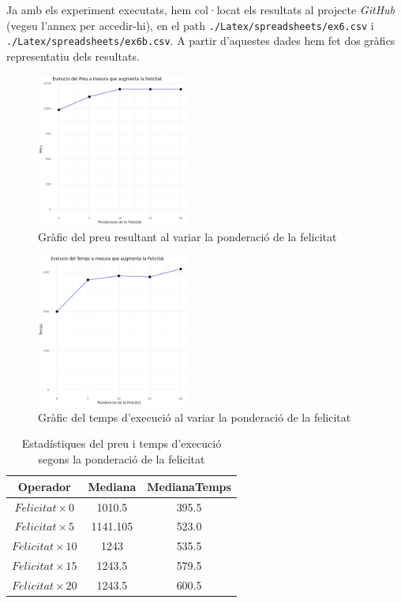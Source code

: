 \documentclass[a4paper]{article}
\begin{document}
	Ja amb els experiment executats, hem col·locat els resultats al projecte \textit{GitHub} (vegeu l'annex per accedir-hi), en el path \texttt{./Latex/spreadsheets/ex6.csv} i \texttt{./Latex/spreadsheets/ex6b.csv}. A partir d'aquestes dades hem fet dos gràfics representatiu dels resultats.
	
	\begin{figure}[H]
		\centering
		\includegraphics[width=0.45\textwidth]{images/exp6_grafic.png}
		\caption{Gràfic del preu resultant al variar la ponderació de la felicitat}
		\label{fig:exp6a_grafic}
	\end{figure}
	
	\begin{figure}[H]
		\centering
		\includegraphics[width=0.45\textwidth]{images/exp6b_grafic.png}
		\caption{Gràfic del temps d'execució al variar la ponderació de la felicitat}
		\label{fig:exp6b_grafic}
	\end{figure}
	
	\begin{table}[H]
		\centering
		\begin{tabular}{|c|c|c|}
			\hline
			\textbf{Operador} & \textbf{Mediana} & \textbf{MedianaTemps} \\
			\hline
			$Felicitat \times 0$ & 1010.5 & 395.5\\
			\hline
			$Felicitat \times 5$ & 1141.105 & 523.0\\
			\hline
			$Felicitat \times 10$ & 1243 & 535.5\\
			\hline
			$Felicitat \times 15$ & 1243.5 & 579.5\\
			\hline
			$Felicitat \times 20$ & 1243.5 & 600.5\\
			\hline
		\end{tabular}
		\caption{Estadístiques del preu i temps d'execució segons la ponderació de la felicitat}
		\label{tab:exp6_estadisticas}
	\end{table}
	
\end{document}
